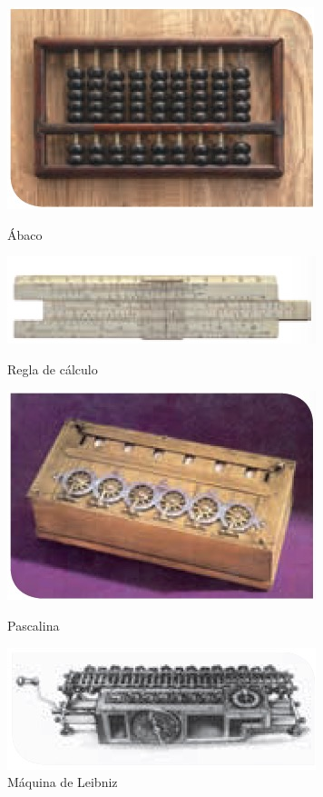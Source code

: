 \documentclass[11pt]{book}
\begin{document}
\begin{figure}[H]
  \begin{minipage}[b]{0.5\linewidth}
    \centering
    \includegraphics[width=0.7\linewidth]{abaco.jpg}
    \caption{\'Abaco}
    \label{fig:a}
  \end{minipage}%
  \begin{minipage}[b]{0.5\linewidth}
    \centering
    \includegraphics[width=0.7\linewidth]{regla_calculo.jpg}
    \caption{Regla de c\'alculo}
    \label{fig:b}
  \end{minipage}
  \begin{minipage}[b]{0.5\linewidth}
    \centering
    \includegraphics[width=0.7\linewidth]{pascalina.jpg}
    \caption{Pascalina}
    \label{fig:c}
  \end{minipage}%
  \begin{minipage}[b]{0.5\linewidth}
    \centering
    \includegraphics[width=0.7\linewidth]{maquina_Leibniz.jpg}
    \caption{M\'aquina de Leibniz}
    \label{fig:d}
  \end{minipage}
  \label{fig:fig7}
\end{figure}
\end{document}
